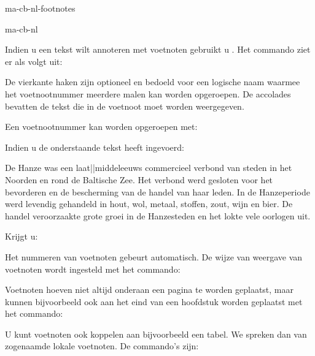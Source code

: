 \startonderdeel ma-cb-nl-footnotes

\produkt ma-cb-nl




Indien u een tekst wilt annoteren met voetnoten gebruikt u
\type{\voetnoot}. Het commando ziet er als volgt uit:


De vierkante haken zijn optioneel en bedoeld voor een
logische naam waarmee het voetnootnummer meerdere malen kan
worden opgeroepen. De accolades bevatten de tekst die in de
voetnoot moet worden weergegeven.

Een voetnootnummer kan worden opgeroepen met:


Indien u de onderstaande tekst heeft ingevoerd:

\startbuffer
De Hanze was een laat||middeleeuws commercieel verbond van
steden in het Noorden en rond de Baltische Zee. Het verbond
werd gesloten voor het bevorderen en de bescherming van de
handel van haar leden. In de Hanzeperiode werd levendig gehandeld in hout,
wol, metaal, stoffen, zout, wijn en bier. De handel
veroorzaakte grote groei in de Hanzesteden en het lokte vele oorlogen
uit.\noot[oorlog]
\stopbuffer

\typebuffer

Krijgt u:

\haalbuffer

Het nummeren van voetnoten gebeurt automatisch. De wijze van
weergave van voetnoten wordt ingesteld met het commando:


Voetnoten hoeven niet altijd onderaan een pagina te worden
geplaatst, maar kunnen bijvoorbeeld ook aan het eind van een
hoofdstuk worden geplaatst met het commando:


U kunt voetnoten ook koppelen aan bijvoorbeeld een tabel. We
spreken dan van zogenaamde lokale voetnoten. De commando's
zijn:




